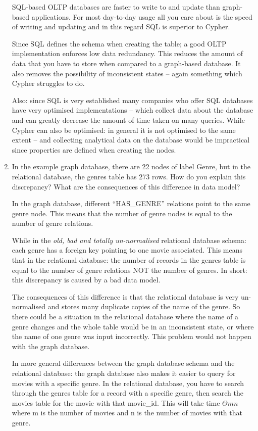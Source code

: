 \documentclass[10pt,\jkfside,a4paper]{article}
\begin{document}
\begin{enumerate}
SQL-based OLTP databases are faster to write to and update than graph-based applications.
For most day-to-day usage all you care about is the speed of writing and updating and 
in this regard SQL is superior to Cypher.

Since SQL defines the schema when creating the table; a good OLTP implementation 
enforces low data redundancy. This reduces the amount of data that you have 
to store when compared to a graph-based database. It also removes the possibility 
of inconsistent states -- again something which Cypher struggles to do.

Also: since SQL is very established many companies who offer SQL databases have very 
optimised implementations -- which collect data about the database and can 
greatly decrease the amount of time taken on many queries. While Cypher can also 
be optimised: in general it is not optimised to the same extent -- and collecting 
analytical data on the database would be impractical since properties are 
defined when creating the nodes.

\item{In the example graph database, there are 22 nodes of label Genre, but 
in the relational database, the genres table has 273 rows. How do you 
explain this discrepancy? What are the consequences of this difference in 
data model?}

In the graph database, different ``HAS\_GENRE'' relations point to the same genre 
node. This means that the number of genre nodes is equal to the number of genre 
relations.

While in the \textit{old, bad and totally un-normalised} relational 
database schema: each genre has a foreign key pointing to one movie associated.
This means that in the relational database: the number of records in the genres 
table is equal to the number of genre relations NOT the number of genres.
In short: this discrepancy is caused by a bad data model.

The consequences of this difference is that the relational database is 
very un-normalised and stores many duplicate copies of the name of the genre. 
So there could be a situation in the relational database where the name of a 
genre changes and the whole table would be in an inconsistent state, or where 
the name of one genre was input incorrectly. This problem would not happen with 
the graph database. 

In more general differences between the graph database schema and the relational 
database: the graph database also makes it easier to query 
for movies with a specific genre. In the relational database, you have to search 
through the genres table for a record with a specific genre, then search the 
movies table for the movie with that movie\_id. This will take time $\Theta{mn}$ 
where m is the number of movies and n is the number of movies with that genre. 


\end{enumerate}
\end{document}
